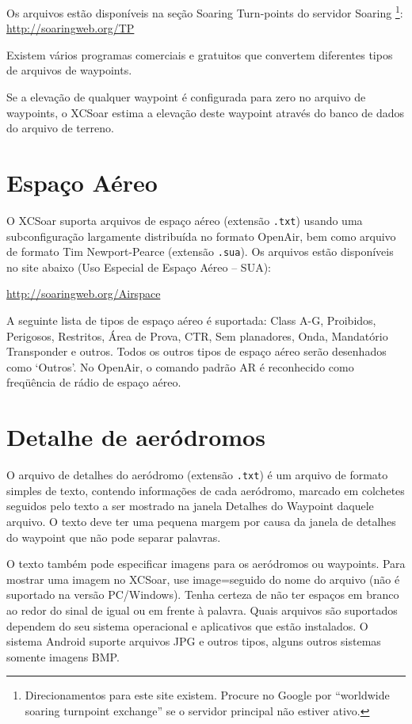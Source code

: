 Os arquivos estão disponíveis na seção Soaring Turn-points do servidor Soaring \footnote{Direcionamentos para este site existem.  Procure no Google por “worldwide soaring turnpoint exchange” se o servidor principal não estiver ativo.}: \url{http://soaringweb.org/TP}

Existem vários programas comerciais e gratuitos que convertem diferentes tipos de arquivos de waypoints.

Se a elevação de qualquer waypoint é configurada para zero no arquivo de waypoints, o XCSoar estima a elevação deste waypoint através do banco de dados do arquivo de terreno.

\section{Espaço Aéreo}

O XCSoar suporta arquivos de espaço aéreo (extensão \verb|.txt|) usando uma subconfiguração largamente distribuída no formato OpenAir, bem como arquivo de formato Tim Newport-Pearce  (extensão \verb|.sua|). Os arquivos estão disponíveis no site abaixo (Uso Especial de Espaço Aéreo – SUA):

\url{http://soaringweb.org/Airspace}

A seguinte lista de tipos de espaço aéreo é suportada: Class A-G, Proibidos, Perigosos, Restritos, Área de Prova, CTR, Sem planadores, Onda, Mandatório Transponder e outros.  Todos os outros tipos de espaço aéreo serão desenhados como ‘Outros’.  No OpenAir, o comando padrão AR é reconhecido como freqüência de rádio de espaço aéreo.

\section{Detalhe de aeródromos}\label{sec:airfield-details}

O arquivo de detalhes do aeródromo (extensão \verb|.txt|) é um arquivo de formato simples de texto, contendo informações de cada aeródromo, marcado em colchetes seguidos pelo texto a ser mostrado na janela Detalhes do Waypoint daquele arquivo.  O texto deve ter uma pequena margem por causa da janela de detalhes do waypoint que não pode separar palavras.

O texto também pode especificar imagens para os aeródromos ou waypoints.  Para mostrar uma imagem no XCSoar, use image=seguido do nome do arquivo (não é suportado na versão PC/Windows).  Tenha certeza de não ter espaços em branco ao redor do sinal de igual ou em frente à palavra.  Quais arquivos são suportados dependem do seu sistema operacional e aplicativos que estão instalados.  O sistema Android suporte arquivos JPG e outros tipos, alguns outros sistemas somente imagens BMP.

